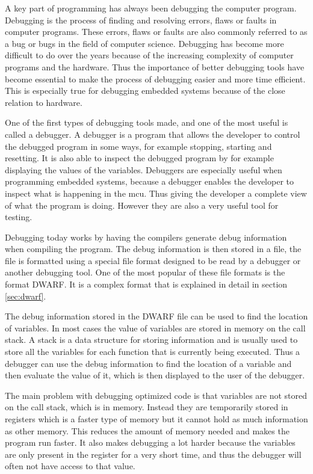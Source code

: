 
A key part of programming has always been debugging the computer program.
Debugging is the process of finding and resolving errors, flaws or faults in computer programs.
These errors, flaws or faults are also commonly referred to as a bug or bugs in the field of computer science.
Debugging has become more difficult to do over the years because of the increasing complexity of computer programs and the hardware.
Thus the importance of better debugging tools have become essential to make the process of debugging easier and more time efficient.
This is especially true for debugging  embedded systems because of the close relation to hardware.


One of the first types of debugging tools made, and one of the most useful is called a debugger.
A debugger is a program that allows the developer to control the debugged program in some ways, for example stopping, starting and resetting.
It is also able to inspect the debugged program by for example displaying the values of the variables.
Debuggers are especially useful when programming embedded systems, because a debugger enables the developer to inspect what is happening in the \gls{mcu}.
Thus giving the developer a complete view of what the program is doing.
However they are also a very useful tool for testing.


Debugging today works by having the compilers generate debug information when compiling the program.
The debug information is then stored in a file, the file is formatted using a special file format designed to be read by a debugger or another debugging tool.
One of the most popular of these file formats is the format \gls{DWARF}.
It is a complex format that is explained in detail in section \ref{sec:dwarf}.


The debug information stored in the \gls{DWARF} file can be used to find the location of variables.
In most cases the value of variables are stored in memory on the call stack.
A stack is a data structure for storing information and is usually used to store all the variables for each function that is currently being executed.
Thus a debugger can use the debug information to find the location of a variable and then evaluate the value of it, which is then displayed to the user of the debugger.


The main problem with debugging optimized code is that variables are not stored on the call stack, which is in memory.
Instead they are temporarily stored in registers which is a faster type of memory but it cannot hold as much information as other memory.
This reduces the amount of memory needed and makes the program run faster.
It also makes debugging a lot harder because the variables are only present in the register for a very short time, and thus the debugger will often not have access to that value.


